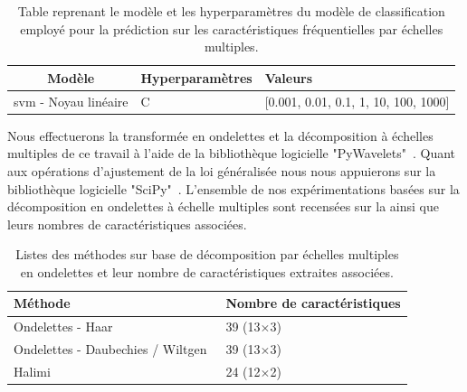 \begin{table}[H]
    \centering
    \begin{tabular}{cll}
        \toprule
        \textbf{Modèle}                                 & \textbf{Hyperparamètres}  & \textbf{Valeurs}                          \\ \midrule
        \gls{svm} - Noyau linéaire                      & C                         & [0.001, 0.01, 0.1, 1, 10, 100, 1000]      \\ 
        \bottomrule 
    \end{tabular} 
    \caption{Table reprenant le modèle et les hyperparamètres du modèle de classification employé pour la prédiction sur les caractéristiques fréquentielles par échelles multiples.}
    \label{tab:image_improvement_multiscale_frequency}
\end{table}\par

Nous effectuerons la transformée en ondelettes et la décomposition à échelles multiples de ce travail à l'aide de la bibliothèque logicielle "PyWavelets"~\cite{lee2006}. Quant aux opérations d'ajustement de la loi généralisée nous nous appuierons sur la bibliothèque logicielle "SciPy"~\cite{Virtanen2020}. L'ensemble de nos expérimentations basées sur la décomposition en ondelettes à échelle multiples sont recensées sur la  ainsi que leurs nombres de caractéristiques associées.\par

\begin{table}[h]
    \centering
    \begin{tabular}{ll}
        \toprule
        \textbf{Méthode}                                    & \textbf{Nombre de caractéristiques}   \\ \hline
        Ondelettes - Haar                                   & 39 (13$\times$3)   \\ \hline
        Ondelettes - Daubechies / Wiltgen~\cite{Wiltgen2008}& 39 (13$\times$3)   \\ \hline
        Halimi~\cite{Halimi2017a}                           & 24 (12$\times$2)   \\
        \bottomrule
    \end{tabular}
    \caption{Listes des méthodes sur base de décomposition par échelles multiples en ondelettes et leur nombre de caractéristiques extraites associées.}
    \label{tab:wavelet_multiscale_nb_features}
\end{table}\par

